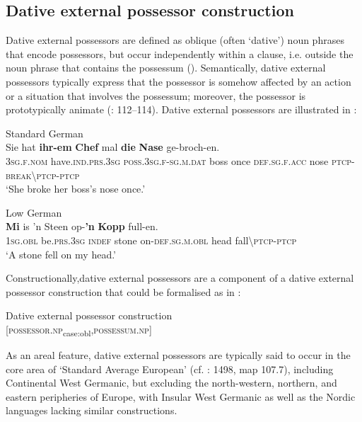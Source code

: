 \documentclass[output=paper]{langsci/langscibook}
\begin{document}
 
 \subsection{Dative external possessor construction}\label{sec:hoeder:4.6}

Dative external possessors are defined as oblique (often ‘dative’) noun phrases that encode possessors, but occur independently within a clause, i.e. outside the noun phrase that contains the possessum (\citealt{Haspelmath.1999, Haspelmath.2001, Konig.2001}). Semantically, dative external possessors typically express that the possessor is somehow affected by an action or a situation that involves the possessum; moreover, the possessor is prototypically animate (\citealt{Haspelmath.1999}: 112–114). Dative external possessors are illustrated in :

 
\ea\label{ex:hoeder:20}
	\ea\label{ex:hoeder:20a}
	Standard German\\
	\gll Sie hat \textbf{ihr-em} \textbf{Chef} mal \textbf{die} \textbf{Nase} ge-broch-en.\\
     3\textsc{sg.f.nom} have.\textsc{ind.prs.3sg} \textsc{poss.3sg.f-sg.m.dat} boss once \textsc{def.sg.f.acc} nose \textsc{ptcp-break{\textbackslash}ptcp-ptcp}\\
	\glt `She broke her boss’s nose once.'

	\ex\label{ex:hoeder:20b}
	Low German\\
	\gll \textbf{Mi} is ’n Steen op-\textbf{’n} \textbf{Kopp} full-en.\\
     1\textsc{sg.obl} be.\textsc{prs.3sg} \textsc{indef} stone on-\textsc{def.sg.m.obl} head fall{\textbackslash}\textsc{ptcp-ptcp}\\
	\glt `A stone fell on my head.'
\z
\z

Constructionally,dative external possessors are a component of a dative external possessor construction that could be formalised as in :

\ea
\label{ex:hoeder:21}
	Dative external possessor construction\\
     {[}\textsc{possessor.np}\textsubscript{case:obl},\textsc{possessum.np}{]}
  \z
  
  
As an areal feature, dative external possessors are typically said to{} occur in the core area of ‘Standard Average European’ (cf. \citealt{Haspelmath.2001}: 1498, map 107.7), including Continental West Germanic, but excluding the north-western, northern, and eastern peripheries of Europe, with Insular West Germanic as well as the Nordic languages lacking similar constructions.
\end{document}
